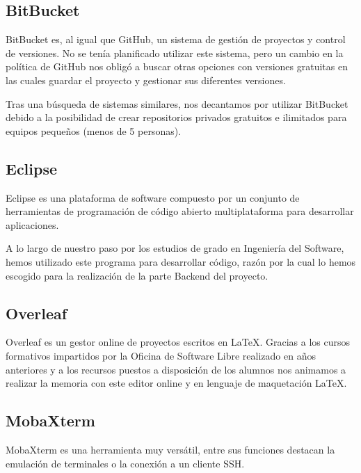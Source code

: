      \subsection{BitBucket}
     BitBucket es, al igual que GitHub, un sistema de gestión de proyectos y control de versiones. No se tenía planificado utilizar este sistema, pero un cambio en la política de GitHub nos obligó a buscar otras opciones con versiones gratuitas en las cuales guardar el proyecto y gestionar sus diferentes versiones.
     \newline
     
     Tras una búsqueda de sistemas similares, nos decantamos por utilizar BitBucket debido a la posibilidad de crear repositorios privados gratuitos e ilimitados para equipos pequeños (menos de 5 personas).
     
     \subsection{Eclipse}
     Eclipse es una plataforma de software compuesto por un conjunto de herramientas de programación de código abierto multiplataforma para desarrollar aplicaciones\cite{eclipse}.
     \newline
     
     A lo largo de nuestro paso por los estudios de grado en Ingeniería del Software, hemos utilizado este programa para desarrollar código, razón por la cual lo hemos escogido para la realización de la parte Backend del proyecto.
     
     
     \subsection{Overleaf}
     Overleaf es un gestor online de proyectos escritos en \LaTeX. Gracias a los cursos formativos impartidos por la Oficina de Software Libre\cite{ucmsoftwarelibre} realizado en años anteriores y a los recursos puestos a disposición de los alumnos\cite{recursoslatex} nos animamos a realizar la memoria con este editor online y en lenguaje de maquetación \LaTeX.
     
     
         \subsection{MobaXterm}
     MobaXterm es una herramienta muy versátil, entre sus funciones destacan la emulación de terminales o la conexión a un cliente SSH.
     \newline 
     
